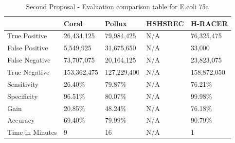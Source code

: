 \documentclass[12pt]{llncs}
\newcommand{\TBstrut}{{\rule{0pt}{7ex}}{\rule[2ex]{0pt}{0pt}}} %
\begin{document}
\begin{longtable}{|m{33mm}|m{20mm}|m{20mm}|m{20mm}|m{20mm}|}
	    \caption{\label{tab:eval-3}Second Proposal - Evaluation comparison table for E.coli 75a}\\
        \hline
           & Coral & Pollux & HSHSREC & H-RACER\cellcolor{DarkGray} \TBstrut\\ %
        \hline
           True Positive & 26,434,125 & 79,984,425 & N/A & 76,325,475\cellcolor{LightGray} \TBstrut\\ %
        \hline
           False Positive & 5,549,925 & 31,675,650 & N/A & 33,000\cellcolor{LightGray} \TBstrut\\ %
        \hline
           False Negative & 73,707,075 & 20,164,125 & N/A & 23,823,075\cellcolor{LightGray} \TBstrut\\ %
        \hline
           True Negative & 153,362,475 & 127,229,400 & N/A & 158,872,050\cellcolor{LightGray} \TBstrut\\ %
        \hline
           Sensitivity & 26.40\% & 79.87\% & N/A & 76.21\%\cellcolor{LightGray} \TBstrut\\ %
        \hline
           Specificity & 96.51\% & 80.07\% & N/A & 99.98\%\cellcolor{LightGray} \TBstrut\\ %
        \hline
           Gain & 20.85\% & 48.24\% & N/A & 76.18\%\cellcolor{LightGray} \TBstrut\\ %
        \hline
           Accuracy & 69.40\% & 79.99\% & N/A & 90.79\%\cellcolor{LightGray} \TBstrut\\ %
        \hline
           Time in Minutes& 9 & 16 & N/A & 1\cellcolor{LightGray} \TBstrut\\ %
        \hline
\end{longtable}
\newpage
\end{document}

